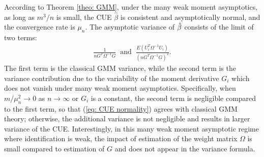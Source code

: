 \documentclass[12pt]{article}
\begin{document}
According to Theorem \ref{theo: GMM}, under the many weak moment asymptotics, as long as $ m^3/n$  is small, the CUE $ \hat\beta $ is consistent and asymptotically normal, and  the convergence rate is $ \mu_n $.  The asymptotic variance of $ \hat{{ \beta}}$ consists of the limit of two terms:
\begin{align}
	\frac{1}{ n G^T\Omega^{-1} G} ~\mbox{ and }  ~ 
	\frac{ E(U_i^T\Omega^{-1} U_i)}{(n G^T\Omega^{-1} G)^2} \label{eq: a.var}. 
\end{align} 
The first term is the classical GMM variance, while the second term is the variance contribution due to the  variability of the moment derivative $ G_i $ which does not vanish under many weak moment asymptotics. Specifically, when $ m/\mu_n^2\rightarrow 0$ as $n\to\infty$ or $G_i $ is a constant,  the second term  is negligible compared to the first term, so that  (\ref{eq: CUE normality})  agrees with classical GMM theory; otherwise, the additional variance is not negligible and results in larger variance of the CUE. Interestingly, in this many weak moment asymptotic regime where identification is weak, the impact of  estimation of the weight matrix $ \Omega $ is small compared to estimation of $ G $ and does not appear in the variance formula.
\end{document}
